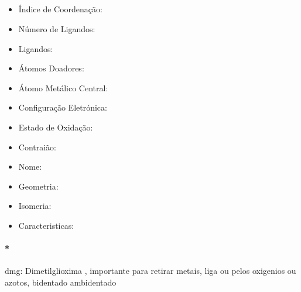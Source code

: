 \documentclass[12pt]{article}
\begin{document}
	\subsection{}
	\begin{itemize}
   
   \item Índice de Coordenação:
   
   \item Número de Ligandos:
   
   \item Ligandos:
   
   \item Átomos Doadores:
   
   \item Átomo Metálico Central:
   
   \item Configuração Eletrónica:
   
   \item Estado de Oxidação:
   
   \item Contraião:
   
   \item Nome:
   
   \item Geometria:
   
   \item Isomeria:

	\item Caracteristicas:

	\end{itemize}
	
\break

\paragraph{*}
dmg: Dimetilglioxima , importante para retirar metais, liga ou pelos oxigenios ou azotos, bidentado ambidentado


	
\end{document}
